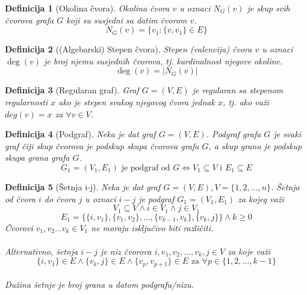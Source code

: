 \documentclass[11pt]{article}
\newtheorem{definition}{Definicija}
\begin{document}
		\begin{definition}[Okolina čvora]
		Okolina čvora $v$ u oznaci $N_G(v)$ je skup svih čvorova grafa $G$ koji su susjedni sa datim čvorom $v$.
		\[N_G(v) = \{ v_1 : \{v, v_1\} \in E\}\]
		\end{definition}
	
		\begin{definition}[(Algebarski) Stepen čvora]
		Stepen (valencija) čvora $v$ u oznaci $\deg(v)$ je broj njemu susjednih čvorova, tj. kardinalnost njegove okoline.
		\[\deg(v) = |N_G(v)|\]
		\end{definition}
		
		\begin{definition}[Regularan graf]
		Graf $G=(V,E)$ je regularan sa stepenom regularnosti $x$ ako je stepen svakog njegovog čvora jednak $x$, tj. ako važi $deg(v) = x$ za $\forall v \in V$. 
		\end{definition}
	
		\begin{definition}[Podgraf]
		Neka je dat graf $G = (V, E)$. Podgraf grafa $G$ je svaki graf čiji skup čvorova je podskup skupa čvorova grafa $G$, a skup grana je podskup skupa grana grafa $G$.
		\[ G_1 = (V_1, E_1) \text{ je podgraf od } G \Leftrightarrow V_1 \subseteq V \text{ i } E_1 \subseteq E \]
		\end{definition}
	
		\begin{definition}[Šetnja i-j]
		Neka je dat graf $G = (V, E), V = \{1, 2, \dots, n\}$. Šetnja od čvora $i$ do čvora $j$ u oznaci $i-j$ je podgraf $G_1 = (V_1, E_1)$ za kojeg važi 
		\[
		 	V_1 \subseteq V \land  i \in V_1 \land j \in V_1
		\]
		\[ 
		 	E_1 = \{\{i,v_1\},\{v_1,v_2\},\dots,\{v_{k-1},v_k\},\{v_k,j\}\} \land k \geq 0
		\] 
		Čvorovi $v_1,v_2 \dots v_k \in V_1 $ ne moraju isključivo biti različiti.
			\paragraph{}
			Alternativno, šetnja $i-j$ je niz čvorova $i, v_1, v_2, \dots, v_k, j \in V$ za koje važi 
			\[
				\{i,v_1\} \in E \land \{v_k,j\} \in E \land \{v_p,v_{p+1}\} \in E \text{ za } \forall p \in \{1,2, \dots, k-1\} 
			\]
			\paragraph{}
			Dužina šetnje je broj grana u datom podgrafu/nizu.
		\end{definition}
	
\end{document}
